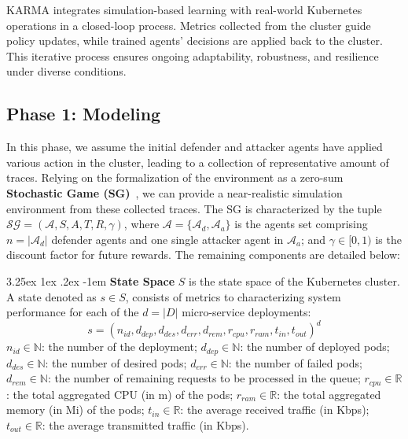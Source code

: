 \documentclass[conference]{IEEEtran}
\makeatletter
\renewcommand\paragraph{\@startsection{paragraph}{5}{\z@}%
  {3.25ex \@plus1ex \@minus.2ex}%
  {-1em}%
  {\normalfont\normalsize\bfseries}}
\makeatother
\begin{document}
KARMA integrates simulation-based learning with real-world Kubernetes operations in a closed-loop process. Metrics collected from the cluster guide policy updates, while trained agents' decisions are applied back to the cluster. This iterative process ensures ongoing adaptability, robustness, and resilience under diverse conditions.


\subsection{Phase 1: Modeling}

In this phase, we assume the initial defender and attacker agents have applied various action in the cluster, leading to a collection of representative amount of traces. Relying on the formalization of the environment as a zero-sum \textbf{Stochastic Game (SG)}~\cite{shapley1953stochastic}, we can provide a near-realistic simulation environment from these collected traces. The SG is characterized by the tuple $\mathcal{SG} = (\mathcal{A}, S, A, T, R, \gamma)$, where $\mathcal{A} = \{\mathcal{A}_d, \mathcal{A}_a\}$ is the agents set comprising $n = |\mathcal{A}_d|$ defender agents and one single attacker agent in $\mathcal{A}_a$; and $\gamma \in [0, 1)$ is the discount factor for future rewards. The remaining components are detailed below:

\noindent \paragraph{\textbf{State Space}} $S$ is the state space of the Kubernetes cluster. A state denoted as $s \in S$, consists of metrics to characterizing system performance for each of the $d = |D|$ micro-service deployments:
$$
s = (n_{id}, d_{dep}, d_{des}, d_{err}, d_{rem}, r_{cpu}, r_{ram}, t_{in}, t_{out})^d
$$
$n_{id} \in \mathbb{N}$: the number of the deployment; \quad
$d_{dep} \in \mathbb{N}$: the number of deployed pods; \quad 
$d_{des} \in \mathbb{N}$: the number of desired pods; \quad
$d_{err} \in \mathbb{N}$: the number of failed pods; \quad
$d_{rem} \in \mathbb{N}$: the number of remaining requests to be processed in the queue; \quad
$r_{cpu} \in \mathbb{R}$: the total aggregated CPU (in m) of the pods; \quad
$r_{ram} \in \mathbb{R}$: the total aggregated memory (in Mi) of the pods; \quad
$t_{in} \in \mathbb{R}$: the average received traffic (in Kbps); \quad
$t_{out} \in \mathbb{R}$: the average transmitted traffic (in Kbps).
\end{document}
